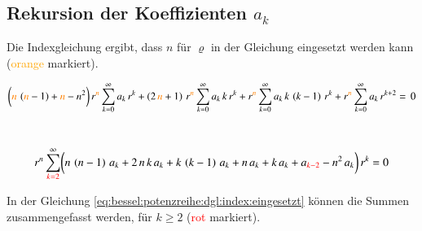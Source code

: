 
\subsection{Rekursion der Koeffizienten $a_k$}
\begin{normalsize}
	Die Indexgleichung ergibt, dass $n$ f\"ur $\varrho$ in der Gleichung  eingesetzt werden kann (\textcolor{orange}{orange} markiert).
\end{normalsize}
\begin{align}
	\biggl(
	\textcolor{orange}{n} \, \left( \textcolor{orange}{n} - 1 \right)
	+
	\textcolor{orange}{n}
	-
	n^2
	\biggr)
	\, r^{\textcolor{orange}{n}}
	\sum_{k=0}^{\infty} a_k \, r^k
	+
	\left(	
	2 \, \textcolor{orange}{n}
	+
	1
	\right)
	\, r^{\textcolor{orange}{n}}
	\sum_{k=0}^{\infty} a_k \, k \, r^k
	+
	r^{\textcolor{orange}{n}}
	\sum_{k=0}^{\infty} a_k \, k \, \left( k - 1 \right) \, r^k
	+
	r^{\textcolor{orange}{n}}
	\sum_{k=0}^{\infty} a_k \, r^{k + 2}
	= \, 0
	\label{eq:bessel:potenzreihe:dgl:index:eingesetzt}
\end{align}
\\
\begin{normalsize}

\end{normalsize}
\begin{align}
	r^n
	\sum_{\textcolor{red}{k=2}}^{\infty}
	\biggl(
	n \, \left( n - 1 \right) \, a_k 
	+
	2 \, n \, k \, a_k
	+
	k \, \left( k - 1 \right) \, a_k
	+
	n \, a_k
	+
	k \, a_k
	+
	a_{\textcolor{red}{k - 2}}
	-
	n^2 \, a_k
	\biggr)
	\, r^k
	= 0 
	\label{eq:bessel:summe:zusammengefasst}
\end{align}
\begin{normalsize}
	In der Gleichung \ref{eq:bessel:potenzreihe:dgl:index:eingesetzt} k\"onnen die Summen zusammengefasst werden,
	f\"ur $k \geq 2$ (\textcolor{red}{rot} markiert).
\end{normalsize}
